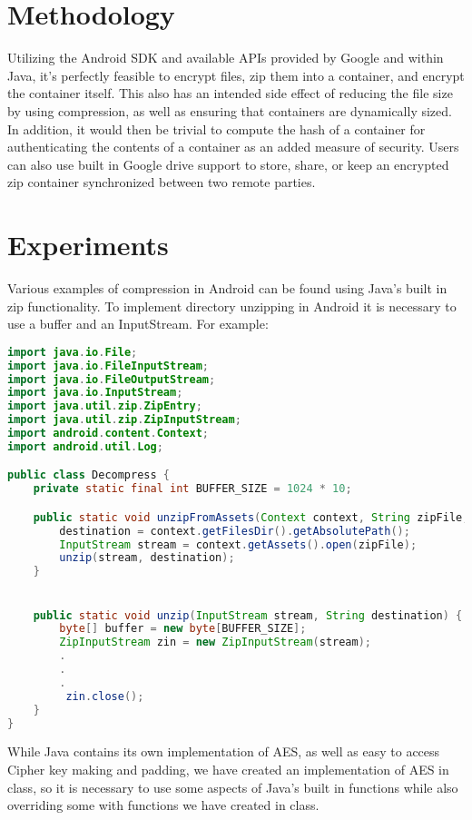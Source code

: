 \documentclass[10pt,a4paper]{article}
\begin{document}
\section{Methodology}
Utilizing the Android SDK and available APIs provided by Google and within Java, it’s perfectly feasible to encrypt files, zip them into a container, and encrypt the container itself. This also has an intended side effect of reducing the file size by using compression, as well as ensuring that containers are dynamically sized. In addition, it would then be trivial to compute the hash of a container for authenticating the contents of a container as an added measure of security. Users can also use built in Google drive support to store, share, or keep an encrypted zip container synchronized between two remote parties.

\section{Experiments}
Various examples of compression in Android can be found using Java's built in zip functionality. To implement directory unzipping in Android it is necessary to use a buffer and an InputStream. For example:

\begin{lstlisting}[language=Java]
import java.io.File;
import java.io.FileInputStream;
import java.io.FileOutputStream;
import java.io.InputStream;
import java.util.zip.ZipEntry;
import java.util.zip.ZipInputStream;
import android.content.Context;
import android.util.Log;

public class Decompress {
    private static final int BUFFER_SIZE = 1024 * 10;

    public static void unzipFromAssets(Context context, String zipFile, String destination) {
		destination = context.getFilesDir().getAbsolutePath();
		InputStream stream = context.getAssets().open(zipFile);
		unzip(stream, destination);
    }


    public static void unzip(InputStream stream, String destination) {
        byte[] buffer = new byte[BUFFER_SIZE];
        ZipInputStream zin = new ZipInputStream(stream);
		.
		.
		.
         zin.close();
    }
}
\end{lstlisting}

While Java contains its own implementation of AES, as well as easy to access Cipher key making and padding, we have created an implementation of AES in class, so it is necessary to use some aspects of Java's built in functions while also overriding some with functions we have created in class. 
\end{document}
